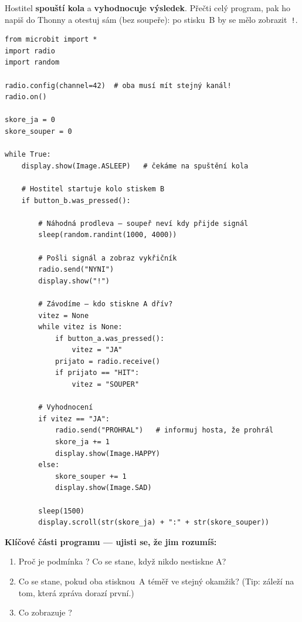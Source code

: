 \begin{ukol}

Hostitel \textbf{spouští kola} a \textbf{vyhodnocuje výsledek}.
Přečti celý program, pak ho napiš do Thonny a otestuj sám (bez soupeře):
po stisku~B by se mělo zobrazit~\texttt{!}.

\begin{lstlisting}
from microbit import *
import radio
import random

radio.config(channel=42)  # oba musí mít stejný kanál!
radio.on()

skore_ja = 0
skore_souper = 0

while True:
    display.show(Image.ASLEEP)   # čekáme na spuštění kola

    # Hostitel startuje kolo stiskem B
    if button_b.was_pressed():

        # Náhodná prodleva — soupeř neví kdy přijde signál
        sleep(random.randint(1000, 4000))

        # Pošli signál a zobraz vykřičník
        radio.send("NYNI")
        display.show("!")

        # Závodíme — kdo stiskne A dřív?
        vitez = None
        while vitez is None:
            if button_a.was_pressed():
                vitez = "JA"
            prijato = radio.receive()
            if prijato == "HIT":
                vitez = "SOUPER"

        # Vyhodnocení
        if vitez == "JA":
            radio.send("PROHRAL")   # informuj hosta, že prohrál
            skore_ja += 1
            display.show(Image.HAPPY)
        else:
            skore_souper += 1
            display.show(Image.SAD)

        sleep(1500)
        display.scroll(str(skore_ja) + ":" + str(skore_souper))
\end{lstlisting}

\textbf{Klíčové části programu — ujisti se, že jim rozumíš:}
\begin{enumerate}
  \item Proč je podmínka ? Co se stane, když nikdo nestiskne A?
  \item Co se stane, pokud oba stisknou~A téměř ve stejný okamžik?
        (Tip: záleží na tom, která zpráva dorazí první.)
  \item Co zobrazuje ?
\end{enumerate}

\odpoved[2cm]

\end{ukol}

